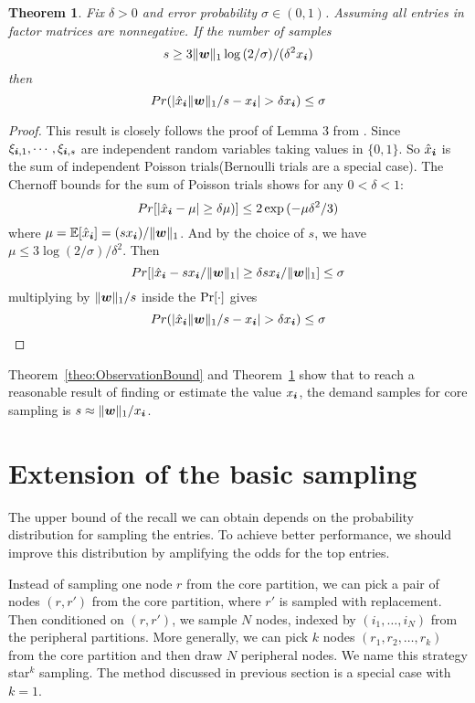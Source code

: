 \documentclass[letterpaper]{article}
\newcommand{\score}[1]{\xi_{\V{i},#1}}
\newcommand{\V}[1]{{\boldsymbol{{\MakeLowercase{#1}}}}}
\newcommand{\predx}{\hat{x}_{\V{i}}}
\newcommand{\norm}[2]{\|#1\|_{#2}}
\newcommand{\Theo}[1]{Theorem~\ref{theo:#1}}
\newtheorem{theorem}{Theorem}
\begin{document}
\begin{theorem}\label{theo:Bound}
Fix $\delta > 0$ and error probability $\sigma \in (0,1)$.
Assuming all entries in factor matrices are nonnegative.
If the number of samples
\[
    s \geq 3\norm{\V{w}}{1}\log{(2/\sigma)}/(\delta^2 x_{\V{i}})
\]
then
\[
    Pr(|\predx\norm{\V{W}}{1}/s - x_{\V{i}}| > \delta x_{\V{i}}) \leq \sigma
\]
\end{theorem}

\begin{proof}
This result is closely follows the proof of Lemma 3 from \cite{BaPiKoSe15}.
Since  $ \score{1},\cdots,\score{s} $
are independent random variables taking values in $\{0,1\}$.
So $\predx$ is the sum of independent Poisson trials(Bernoulli trials are a special case).
The Chernoff bounds for the sum of Poisson trials shows for any $0 <\delta <1 $:
\[
    Pr[|\predx - \mu|\geq\delta\mu)] \leq 2\exp{(-\mu\delta^2/3)}
\]
where $\mu=\mathbb{E}[\predx]=(sx_{\V{i}})/\norm{\V{W}}{1}$.
And by the choice of $s$, we have
$\mu\leq 3\log{(2/\sigma)/\delta^2}$.
Then
\[
    Pr[|\predx-sx_{\V{i}}/\norm{\V{W}}{1}|\geq\delta sx_{\V{i}}/\norm{\V{W}}{1}] \leq \sigma
\]
multiplying by $\norm{\V{W}}{1}/s$ inside the ${\rm Pr}[\cdot]$ gives
\[
    Pr(|\predx\norm{\V{W}}{1}/s - x_{\V{i}}| > \delta x_{\V{i}}) \leq \sigma
\]
\end{proof}
\Theo{ObservationBound} and \Theo{Bound} show that
to reach a reasonable result of finding or estimate the value $x_{\V{i}}$,
the demand samples for core sampling is $s\approx \norm{\V{w}}{1}/x_{\V{i}}$.

\section{Extension of the basic sampling}
The upper bound of the recall we can obtain 
depends on the probability distribution for sampling the entries. 
To achieve better performance, 
we should improve this distribution by amplifying the odds for the top entries.

Instead of sampling one node $r$ from the core partition, 
we can pick a pair of nodes $(r,r')$ from the core partition, 
where $r'$ is sampled with replacement. 
Then conditioned on $(r,r')$, we sample $N$ nodes, 
indexed by $(i_1,\ldots,i_N)$ from the peripheral partitions. 
More generally, we can pick $k$ nodes $(r_1,r_2,\ldots,r_k)$ from the core partition 
and then draw $N$ peripheral nodes. 
We name this strategy star$^k$ sampling. 
The method discussed in previous section is a special case with $k=1$.
\end{document}
